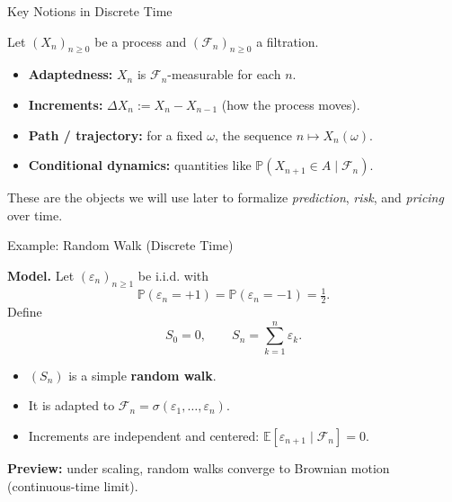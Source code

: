 \documentclass[10pt,aspectratio=169]{beamer}
\begin{document}
\begin{frame}{Key Notions in Discrete Time}

Let \((X_n)_{n\ge 0}\) be a process and \((\mathcal{F}_n)_{n\ge 0}\) a filtration.\pause

\begin{itemize}
  \item \textbf{Adaptedness:}\pause
  \(X_n\) is \(\mathcal{F}_n\)-measurable for each \(n\).\pause
  \item \textbf{Increments:}\pause
  \(\Delta X_n := X_n - X_{n-1}\) (how the process moves).\pause
  \item \textbf{Path / trajectory:}\pause
  for a fixed \(\omega\), the sequence \(n\mapsto X_n(\omega)\).\pause
  \item \textbf{Conditional dynamics:}\pause
  quantities like \(\mathbb{P}(X_{n+1}\in A \mid \mathcal{F}_n)\).\pause
\end{itemize}

\medskip
These are the objects we will use later to formalize \emph{prediction}, \emph{risk}, and \emph{pricing} over time.

\end{frame}

\begin{frame}{Example: Random Walk (Discrete Time)}

\textbf{Model.}\pause\;
Let \((\varepsilon_n)_{n\ge 1}\) be i.i.d. with
\[
\mathbb{P}(\varepsilon_n=+1)=\mathbb{P}(\varepsilon_n=-1)=\tfrac12.
\]\pause
Define
\[
S_0=0,
\qquad
S_n = \sum_{k=1}^n \varepsilon_k.
\]
\pause

\begin{itemize}
  \item \((S_n)\) is a simple \textbf{random walk}.\pause
  \item It is adapted to \(\mathcal{F}_n=\sigma(\varepsilon_1,\dots,\varepsilon_n)\).\pause
  \item Increments are independent and centered: \(\mathbb{E}[\varepsilon_{n+1}\mid \mathcal{F}_n]=0\).\pause
\end{itemize}

\medskip
\textbf{Preview:}\pause\;
under scaling, random walks converge to Brownian motion (continuous-time limit).

\end{frame}
\end{document}
